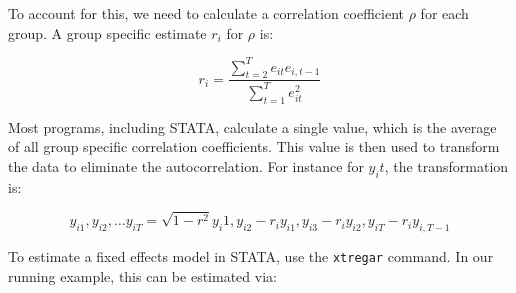 \documentclass[12pt]{article}
\begin{document}
To account for this, we need to calculate a correlation coefficient
$\rho$ for each group. A group specific estimate $r_i$ for $\rho$ is:

\begin{equation*}
  r_i=\frac{\sum_{t=2} ^{T} e_{it} e_{i,t-1}}{\sum_{t=1} ^{T}e^2_{it}}
\end{equation*}

Most programs, including STATA, calculate a single value, which is the
average of all group specific correlation coefficients. This value is
then used to transform the data to eliminate the autocorrelation. For
instance for $y_it$, the transformation is:

\begin{equation*}
  y_{i1}, y_{i2},\ldots y_{iT}= \sqrt{1-r^2}y_i1, y_{i2}-r_i y_{i1},
  y_{i3}-r_i y_{i2}, y_{iT}-r_iy_{i,T-1}
\end{equation*}


To estimate a fixed effects model in STATA, use the \texttt{xtregar}
command. In our running example, this can be estimated via: 
\end{document}
